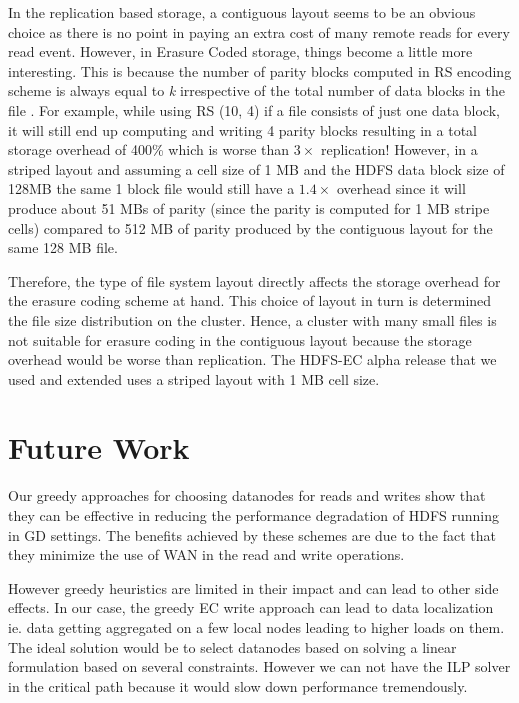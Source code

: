 \documentclass{sig-alternate-05-2015}
\begin{document}

In the replication based storage, a contiguous layout seems to be an obvious choice as there is no point in paying an extra cost of many remote reads for every read event. However, in Erasure Coded storage, things become a little more interesting. This is because the number of parity blocks computed in RS encoding scheme is always equal to \emph{k} irrespective of the total number of data blocks in the file \cite{cloudera-blog}. For example, while using RS (10, 4) if a file consists of just one data block, it will still end up computing and writing 4 parity blocks resulting in a total storage overhead of 400\% which is worse than $3\times $ replication! However, in a striped layout and assuming a cell size of 1 MB and the HDFS data block size of 128MB the same 1 block file would still have a $1.4\times $ overhead since it will produce about 51 MBs of parity (since the parity is computed for 1 MB stripe cells) compared to 512 MB of parity produced by the contiguous layout for the same 128 MB file. 

Therefore, the type of file system layout directly affects the storage overhead for the erasure coding scheme at hand. This choice of layout in turn is determined the file size distribution on the cluster. Hence, a cluster with many small files is not suitable for erasure coding in the contiguous layout because the storage overhead would be worse than replication. The HDFS-EC alpha release that we used and extended uses a striped layout with 1 MB cell size. 

\section{Future Work}

Our greedy approaches for choosing datanodes for reads and writes show that they can be effective in reducing the performance degradation of HDFS running in GD settings. The benefits achieved by these schemes are due to the fact that they minimize the use of WAN in the read and write operations. 

However greedy heuristics are limited in their impact and can lead to other side effects. In our case, the greedy EC write approach can lead to data localization ie. data getting aggregated on a few local nodes leading to higher loads on them. The ideal solution would be to select datanodes based on solving a linear formulation based on several constraints. However we can not have the ILP solver in the critical path because it would slow down performance tremendously.
\end{document}
